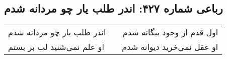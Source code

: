 \begin{center}
\section*{رباعی شماره ۴۲۷: اندر طلب یار چو مردانه شدم}
\label{sec:sh427}
\begin{longtable}{l p{0.5cm} r}
اندر طلب یار چو مردانه شدم
&&
اول قدم از وجود بیگانه شدم
\\
او علم نمی‌شنید لب بر بستم
&&
او عقل نمی‌خرید دیوانه شدم
\\
\end{longtable}
\end{center}
